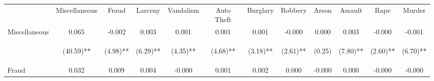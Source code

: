 \begin{tabular}{lccccccccccc}
\toprule \noalign{\smallskip} & Miscellaneous & Fraud & Larceny & Vandalism & Auto Theft & Burglary & Robbery & Arson & Assault & Rape & Murder\\
\noalign{\smallskip}\midrule \noalign{\smallskip}Miscellaneous & 0.065 & -0.002 & 0.003 & 0.001 & 0.001 & 0.001 & -0.000 & 0.000 & 0.003 & -0.000 & -0.001\\
 & \begin{footnotesize}(40.59)**\end{footnotesize} & \begin{footnotesize}(4.98)**\end{footnotesize} & \begin{footnotesize}(6.29)**\end{footnotesize} & \begin{footnotesize}(4.35)**\end{footnotesize} & \begin{footnotesize}(4.68)**\end{footnotesize} & \begin{footnotesize}(3.18)**\end{footnotesize} & \begin{footnotesize}(2.61)**\end{footnotesize} & \begin{footnotesize}(0.25)\end{footnotesize} & \begin{footnotesize}(7.80)**\end{footnotesize} & \begin{footnotesize}(2.60)**\end{footnotesize} & \begin{footnotesize}(6.70)**\end{footnotesize}\\
\noalign{\smallskip}Fraud & 0.032 & 0.009 & 0.004 & -0.000 & 0.001 & 0.002 & 0.000 & -0.000 & 0.000 & -0.000 & -0.000\\

\end{tabular}
